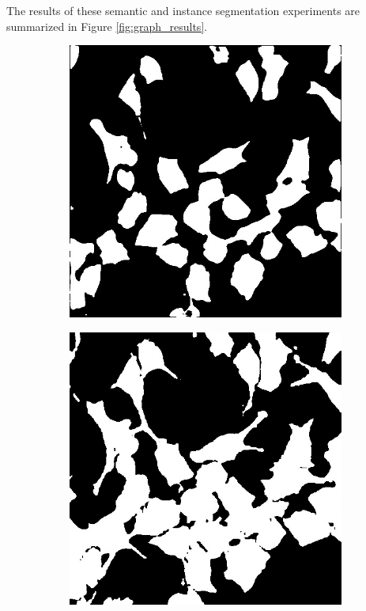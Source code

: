 \documentclass[10pt, journal, compsoc]{IEEEtran}
\begin{document}
The results of these semantic and instance segmentation experiments are summarized in Figure \ref{fig:graph_results}.
\begin{figure}
\centering
\begin{subfigure}[b]{0.49\linewidth}
\includegraphics[width=\linewidth]{weighted/110115-unet.jpg}
\end{subfigure}
\begin{subfigure}[b]{0.49\linewidth}
\includegraphics[width=\linewidth]{weighted/110115-deeplab.jpg}

\end{subfigure}
\end{figure}
\end{document}

